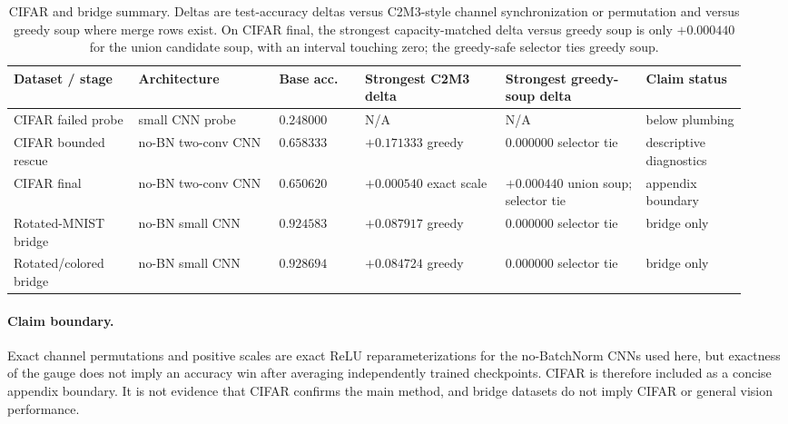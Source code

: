 \begin{table}[t]
\centering
\scriptsize
\begin{tabular}{p{0.16\linewidth}p{0.18\linewidth}p{0.11\linewidth}p{0.18\linewidth}p{0.18\linewidth}p{0.13\linewidth}}
\hline
Dataset / stage & Architecture & Base acc. & Strongest C2M3 delta & Strongest greedy-soup delta & Claim status \\
\hline
CIFAR failed probe & small CNN probe & \(0.248000\) & N/A & N/A & below plumbing \\
CIFAR bounded rescue & no-BN two-conv CNN & \(0.658333\) & \(+0.171333\) greedy & \(0.000000\) selector tie & descriptive diagnostics \\
CIFAR final & no-BN two-conv CNN & \(0.650620\) & \(+0.000540\) exact scale & \(+0.000440\) union soup; selector tie & appendix boundary \\
Rotated-MNIST bridge & no-BN small CNN & \(0.924583\) & \(+0.087917\) greedy & \(0.000000\) selector tie & bridge only \\
Rotated/colored bridge & no-BN small CNN & \(0.928694\) & \(+0.084724\) greedy & \(0.000000\) selector tie & bridge only \\
\hline
\end{tabular}
\caption{CIFAR and bridge summary.  Deltas are test-accuracy deltas versus
C2M3-style channel synchronization or permutation and versus greedy soup where
merge rows exist.  On CIFAR final, the strongest capacity-matched delta versus
greedy soup is only \(+0.000440\) for the union candidate soup, with an interval
touching zero; the greedy-safe selector ties greedy soup.}
\label{tab:cifar-bridge-boundary}
\end{table}

\paragraph{Claim boundary.}
Exact channel permutations and positive scales are exact ReLU
reparameterizations for the no-BatchNorm CNNs used here, but exactness of the
gauge does not imply an accuracy win after averaging independently trained
checkpoints.  CIFAR is therefore included as a concise appendix boundary.  It is
not evidence that CIFAR confirms the main method, and bridge datasets do not
imply CIFAR or general vision performance.

